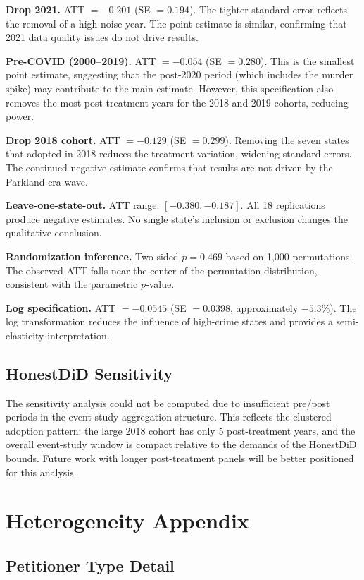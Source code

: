 \documentclass[12pt]{article}
\begin{document}
\textbf{Drop 2021.} ATT $= -0.201$ (SE $= 0.194$). The tighter standard error reflects the removal of a high-noise year. The point estimate is similar, confirming that 2021 data quality issues do not drive results.

\textbf{Pre-COVID (2000--2019).} ATT $= -0.054$ (SE $= 0.280$). This is the smallest point estimate, suggesting that the post-2020 period (which includes the murder spike) may contribute to the main estimate. However, this specification also removes the most post-treatment years for the 2018 and 2019 cohorts, reducing power.

\textbf{Drop 2018 cohort.} ATT $= -0.129$ (SE $= 0.299$). Removing the seven states that adopted in 2018 reduces the treatment variation, widening standard errors. The continued negative estimate confirms that results are not driven by the Parkland-era wave.

\textbf{Leave-one-state-out.} ATT range: $[-0.380, -0.187]$. All 18 replications produce negative estimates. No single state's inclusion or exclusion changes the qualitative conclusion.

\textbf{Randomization inference.} Two-sided $p = 0.469$ based on 1,000 permutations. The observed ATT falls near the center of the permutation distribution, consistent with the parametric $p$-value.

\textbf{Log specification.} ATT $= -0.0545$ (SE $= 0.0398$, approximately $-5.3\%$). The log transformation reduces the influence of high-crime states and provides a semi-elasticity interpretation.

\subsection{HonestDiD Sensitivity}

The \citet{rambachan2023more} sensitivity analysis could not be computed due to insufficient pre/post periods in the event-study aggregation structure. This reflects the clustered adoption pattern: the large 2018 cohort has only 5 post-treatment years, and the overall event-study window is compact relative to the demands of the HonestDiD bounds. Future work with longer post-treatment panels will be better positioned for this analysis.


\section{Heterogeneity Appendix}

\subsection{Petitioner Type Detail}
\end{document}
